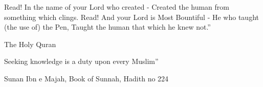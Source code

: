 \begin{epigraphpage}
	\epigraph{Read! In the name of your Lord who created - Created the human from something which clings. Read! And your Lord is Most Bountiful - He who taught (the use of) the Pen, Taught the human that which he knew not.''}{The Holy Quran}
	
	\epigraph{Seeking knowledge is a duty upon every Muslim''}{Sunan Ibn e Majah, Book of Sunnah, Hadith no 224}
\end{epigraphpage}





\tableofcontents





%  
